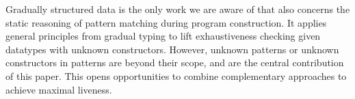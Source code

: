 Gradually structured data \cite{DBLP:journals/pacmpl/MalewskiGT21} is
the only work we are aware of that also concerns the static reasoning
of pattern matching during program construction. It applies general
principles from gradual typing to lift exhaustiveness checking given
datatypes with unknown constructors. However, unknown patterns or
unknown constructors in patterns are beyond their scope, and are the
central contribution of this paper. This opens opportunities to
combine complementary approaches to achieve maximal liveness.




